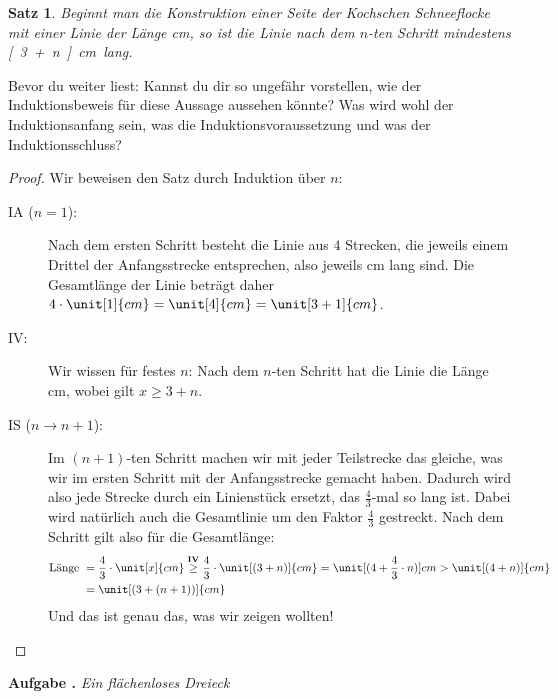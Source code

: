 \documentclass[a4paper,ngerman,12pt]{scrartcl}
\theoremstyle{definition}
\theoremstyle{plain}
\newtheorem{satz}[defn]{Satz}
\theoremstyle{remark}
\newlength{\aufgabenskip}
\newcounter{aufgabennummer}
\newenvironment{aufgabe}[1]{
	\addtocounter{aufgabennummer}{1}
	\textbf{Aufgabe \theaufgabennummer.} \emph{#1} \par
}{\vspace{\aufgabenskip}}
\begin{document}
\begin{satz}
	Beginnt man die Konstruktion einer Seite der Kochschen Schneeflocke mit einer Linie der Länge \unit[3]{cm}, so ist die Linie nach dem $n$-ten Schritt mindestens \unit[3+n]{cm} lang.
\end{satz}

Bevor du weiter liest: Kannst du dir so ungefähr vorstellen, wie der Induktionsbeweis für diese Aussage aussehen könnte? Was wird wohl der Induktionsanfang sein, was die Induktionsvoraussetzung und was der Induktionsschluss?

\begin{proof}
	Wir beweisen den Satz durch Induktion über $n$:
	\begin{description}
		\item[IA ($n=1$):] Nach dem ersten Schritt besteht die Linie aus $4$ Strecken, die jeweils einem Drittel der Anfangsstrecke entsprechen, also jeweils \unit[1]{cm} lang sind. Die Gesamtlänge der Linie beträgt daher $4 \cdot \unit[1]{cm} = \unit[4]{cm} = \unit[3+1]{cm}$.
		\item[IV:] Wir wissen für festes $n$: Nach dem $n$-ten Schritt hat die Linie die Länge \unit[x]{cm}, wobei gilt $x \geq 3+n$.
		\item[IS ($n\to n+1$):] Im $(n+1)$-ten Schritt machen wir mit jeder Teilstrecke das gleiche, was wir im ersten Schritt mit der Anfangsstrecke gemacht haben. Dadurch wird also jede Strecke durch ein Linienstück ersetzt, das $\frac{4}{3}$-mal so lang ist. Dabei wird natürlich auch die Gesamtlinie um den Faktor $\frac{4}{3}$ gestreckt. Nach dem Schritt gilt also für die Gesamtlänge:
			\begin{align*}
			\text{Länge } 	&= \frac{4}{3}\cdot \unit[x]{cm} \overset{\text{\textbf{IV}}}{\geq} \frac{4}{3}\cdot \unit[(3+n)]{cm} = \unit[(4+\frac{4}{3}\cdot n)]{cm} > \unit[(4+ n)]{cm} \\
							&= \unit[(3+ (n+1))]{cm}
			\end{align*}
		Und das ist genau das, was wir zeigen wollten!
	\end{description}
\end{proof}

\begin{aufgabe}{Ein flächenloses Dreieck}
\end{aufgabe}

\end{document}
